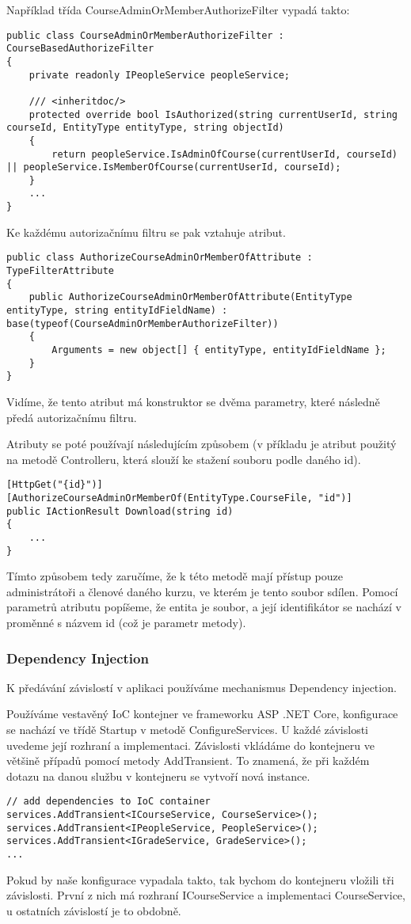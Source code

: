 Například třída CourseAdminOrMemberAuthorizeFilter vypadá takto:
\begin{lstlisting}
public class CourseAdminOrMemberAuthorizeFilter : CourseBasedAuthorizeFilter
{
	private readonly IPeopleService peopleService;
	
	/// <inheritdoc/>
	protected override bool IsAuthorized(string currentUserId, string courseId, EntityType entityType, string objectId)
	{
		return peopleService.IsAdminOfCourse(currentUserId, courseId) || peopleService.IsMemberOfCourse(currentUserId, courseId);
	}
	...
}
\end{lstlisting}

Ke každému autorizačnímu filtru se pak vztahuje atribut.
\begin{lstlisting}
public class AuthorizeCourseAdminOrMemberOfAttribute : TypeFilterAttribute
{
	public AuthorizeCourseAdminOrMemberOfAttribute(EntityType entityType, string entityIdFieldName) : base(typeof(CourseAdminOrMemberAuthorizeFilter))
	{
		Arguments = new object[] { entityType, entityIdFieldName };
	}
}
\end{lstlisting}

Vidíme, že tento atribut má konstruktor se dvěma parametry, které následně předá autorizačnímu filtru. 

Atributy se poté používají následujícím způsobem (v příkladu je atribut použitý na metodě Controlleru, která slouží ke stažení souboru podle daného id).
\begin{lstlisting}
[HttpGet("{id}")]
[AuthorizeCourseAdminOrMemberOf(EntityType.CourseFile, "id")]
public IActionResult Download(string id)
{
	...
}
\end{lstlisting}

Tímto způsobem tedy zaručíme, že k této metodě mají přístup pouze administrátoři a členové daného kurzu, ve kterém je tento soubor sdílen. Pomocí parametrů atributu popíšeme, že entita je soubor, a její identifikátor se nachází v proměnné s názvem id (což je parametr metody).

\subsubsection*{Dependency Injection}

K předávání závislostí v aplikaci používáme mechanismus Dependency injection. 

Používáme vestavěný IoC kontejner ve frameworku ASP .NET Core, konfigurace se nachází ve třídě Startup v metodě ConfigureServices.
U každé závislosti uvedeme její rozhraní a implementaci. 
Závislosti vkládáme do kontejneru ve většině případů pomocí metody AddTransient. To znamená, že při každém dotazu na danou službu v kontejneru se vytvoří nová instance.
\begin{lstlisting}
// add dependencies to IoC container
services.AddTransient<ICourseService, CourseService>();
services.AddTransient<IPeopleService, PeopleService>();
services.AddTransient<IGradeService, GradeService>();
...
\end{lstlisting}
Pokud by naše konfigurace vypadala takto, tak bychom do kontejneru vložili tři závislosti. První z nich má rozhraní ICourseService a implementaci CourseService, u ostatních závislostí je to obdobně.

